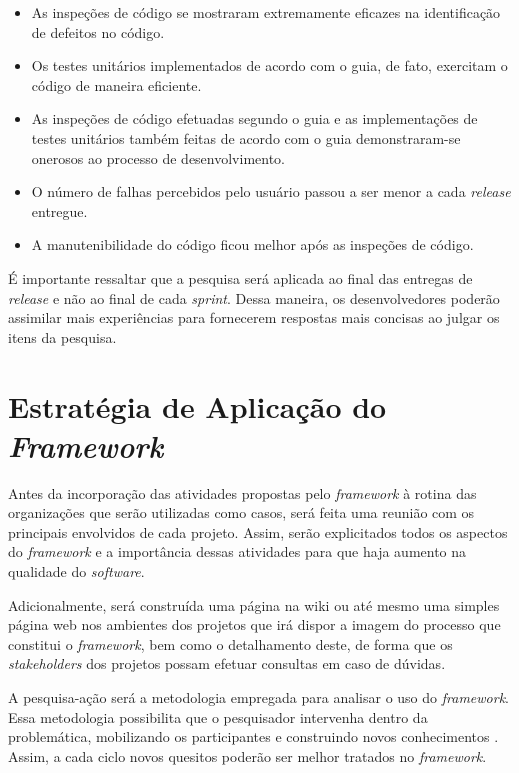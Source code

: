 \begin{itemize}
	\item As inspeções de código se mostraram extremamente eficazes na identificação de defeitos no código.

	\item Os testes unitários implementados de acordo com o guia, de fato, exercitam o código de maneira eficiente.

	\item As inspeções de código efetuadas segundo o guia e as implementações de testes unitários também feitas de acordo com o guia demonstraram-se onerosos ao processo de desenvolvimento.

	\item O número de falhas percebidos pelo usuário passou a ser menor a cada \textit{release} entregue.

	\item A manutenibilidade do código ficou melhor após as inspeções de código.
\end{itemize}

É importante ressaltar que a pesquisa será aplicada ao final das entregas de \textit{release} e não ao final de cada \textit{sprint}. Dessa maneira, os desenvolvedores poderão assimilar mais experiências para fornecerem respostas mais concisas ao julgar os itens da pesquisa.

\section{Estratégia de Aplicação do \textit{Framework}}

Antes da incorporação das atividades propostas pelo \textit{framework} à rotina das organizações que serão utilizadas como casos, será feita uma reunião com os principais envolvidos de cada projeto. Assim, serão explicitados todos os aspectos do \textit{framework} e a importância dessas atividades para que haja aumento na qualidade do \textit{software}.

Adicionalmente, será construída uma página na wiki ou até mesmo uma simples página web nos ambientes dos projetos que irá dispor a imagem do processo que constitui o \textit{framework}, bem como o detalhamento deste, de forma que os \textit{stakeholders} dos projetos possam efetuar consultas em caso de dúvidas.

A pesquisa-ação será a metodologia empregada para analisar o uso do \textit{framework}. Essa metodologia possibilita que o pesquisador intervenha dentro da problemática, mobilizando os participantes e construindo novos conhecimentos \cite{pesquisa}. Assim, a cada ciclo novos quesitos poderão ser melhor tratados no \textit{framework}.
